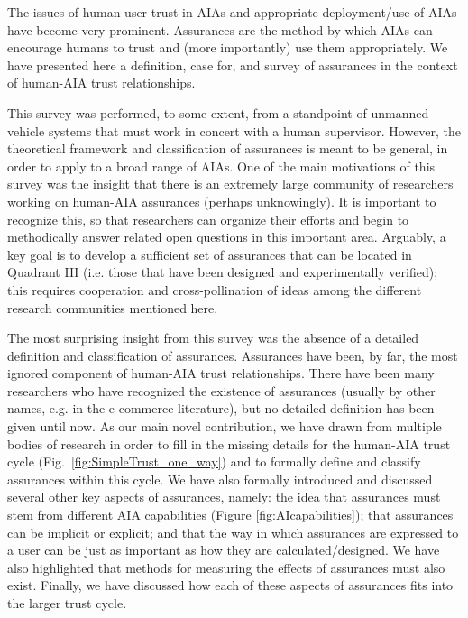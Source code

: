     The issues of human user trust in AIAs and appropriate deployment/use of AIAs have become very prominent. 
    Assurances are the method by which AIAs can encourage humans to trust and (more importantly) use them appropriately. 
    We have presented here a definition, case for, and survey of assurances in the context of human-AIA trust relationships. 
    
This survey was performed, to some extent, from a standpoint of unmanned vehicle systems that must work in concert with a human supervisor. 
However, the theoretical framework and classification of assurances is meant to be general, in order to apply to a broad range of AIAs. 
One of the main motivations of this survey was the insight that there is an extremely large community of researchers working on human-AIA assurances (perhaps unknowingly). 
It is important to recognize this, so that researchers can organize their efforts and begin to methodically answer related open questions in this important area. 
Arguably, a key goal is to develop a sufficient set of assurances that can be located in Quadrant III (i.e. those that have been designed and experimentally verified); this requires cooperation and cross-pollination of ideas among the different research communities mentioned here.

The most surprising insight from this survey was the absence of a detailed definition and classification of assurances. 
Assurances have been, by far, the most ignored component of human-AIA trust relationships. 
There have been many researchers who have recognized the existence of assurances (usually by other names, e.g. in the e-commerce literature), but no detailed definition has been given until now. 
As our main novel contribution, we have drawn from multiple bodies of research in order to fill in the missing details for the human-AIA trust cycle (Fig.~\ref{fig:SimpleTrust_one_way}) and to formally define and classify assurances within this cycle. 
We have also formally introduced and discussed several other key aspects of assurances, namely: the idea that assurances must stem from different AIA capabilities (Figure \ref{fig:AIcapabilities}); that assurances can be implicit or explicit; and that the way in which assurances are expressed to a user can be just as important as how they are calculated/designed. 
We have also highlighted that methods for measuring the effects of assurances must also exist. 
Finally, we have discussed how each of these aspects of assurances fits into the larger trust cycle. %
    
